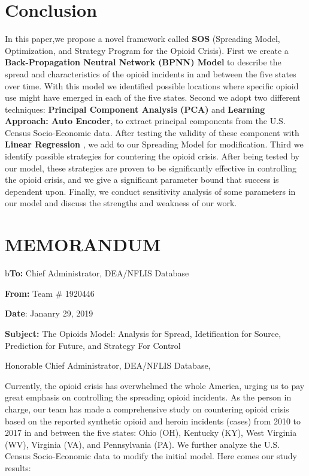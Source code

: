 \documentclass{mcmthesis}
\begin{document}
\section{Conclusion} \label{Sec-Conclusion}
In this paper,we propose a novel framework called \textbf{SOS} (Spreading Model, Optimization, and Strategy Program for the Opioid Crisis). First we create a \textbf{Back-Propagation Neutral Network  (BPNN) Model} to describe the spread and characteristics of the opioid incidents in and between the five states over time. With this model we identified possible locations where specific opioid use might have emerged in each of the five states. Second we adopt two different techniques: \textbf{Principal Component Analysis (PCA)} and \textbf{Learning Approach: Auto Encoder}, to extract principal components from the U.S. Census Socio-Economic data. After testing the validity of these component with \textbf{Linear Regression} ,  we add to our Spreading Model for modification. Third we identify possible strategies for countering the opioid crisis. After being tested by our model, these strategies are proven to be significantly effective in controlling the opioid crisis, and we give a significant parameter bound that success is dependent upon. Finally, we conduct sensitivity analysis of some parameters in our model and discuss the strengths and weakness of our work.

\newpage
\section*{MEMORANDUM} 

b\noindent\textbf{To:} Chief Administrator, DEA/NFLIS Database

\noindent\textbf{From:} Team \# 1920446

\noindent\textbf{Date}: Jananry 29, 2019

\noindent\textbf{Subject:} The Opioids Model: Analysis for Spread, Idetification for Source, Prediction for Future, and Strategy For Control

Honorable Chief Administrator, DEA/NFLIS Database, 

Currently, the opioid crisis has overwhelmed the whole America, urging us to pay great emphasis on controlling the spreading opioid incidents. As the person in charge, our team has made a comprehensive study on countering opioid crisis based on the reported synthetic opioid and heroin incidents (cases) from 2010 to 2017 in and between the five states: Ohio (OH), Kentucky (KY), West Virginia (WV), Virginia (VA), and Pennsylvania (PA). We further analyze the U.S. Census Socio-Economic data to modify the initial model. Here comes our study results:
\end{document}
